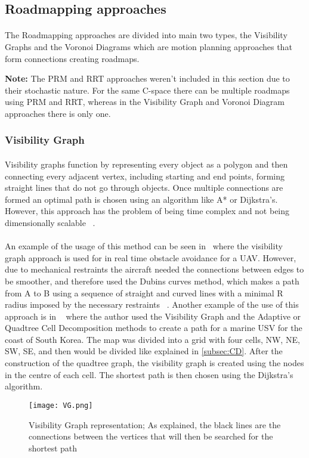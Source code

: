 \subsection{Roadmapping approaches}
\label{subsec:RA}
\paragraph{}The Roadmapping approaches are divided into main two types, the Visibility Graphs and the Voronoi Diagrams which are motion planning approaches
that form connections creating roadmaps. 

\textbf{Note:} The \gls{PRM} and \gls{RRT} approaches weren't included in this section due to their stochastic nature. For the same C-space there
can be multiple roadmaps using PRM and \gls{RRT}, whereas in the Visibility Graph and Voronoi Diagram approaches there is only one.
\subsubsection{Visibility Graph}
\label{subsubsec:VG}
\paragraph{}Visibility graphs function by
representing every object as a polygon and then connecting every adjacent vertex, including starting and end points, 
forming straight lines that do not go through objects. Once multiple connections are formed an optimal path is chosen using an algorithm like A* or 
Dijkstra's. However, this approach has the problem of being time complex and not being dimensionally scalable ~\cite{sym10100450}. 
\paragraph{}An example of the usage of this method can be seen in~\cite{app10165613} where the visibility graph approach is used for in real time
obstacle avoidance for a \gls{UAV}. However, due to mechanical restraints the aircraft needed the connections between edges to be smoother, and therefore
used the Dubins curves method, which makes a path from A to B using a sequence of straight and curved lines with a minimal R radius 
imposed by the necessary restraints ~\cite{aac5c909-7434-3d95-961b-caf3aec6a743}.
Another example of the use of this approach is in ~\cite{LEE2021102887} where the author used the Visibility Graph and the Adaptive or Quadtree Cell Decomposition
methods  to create a path for a marine USV for the coast of South Korea. The map was divided into a grid with four cells, NW, NE, SW, SE, and then would
be divided like explained in \ref{subsec:CD}. After the construction of the quadtree graph, the visibility graph is created using
the nodes in the centre of each cell. The shortest path is then chosen using the Dijkstra's algorithm.
\begin{figure}[h]
    \centering
    \texttt{[image: VG.png]}
    \caption{Visibility Graph representation; As explained, the black lines are the connections between the vertices that will then be searched for the shortest path}
    \label{fig:VG}
\end{figure}
